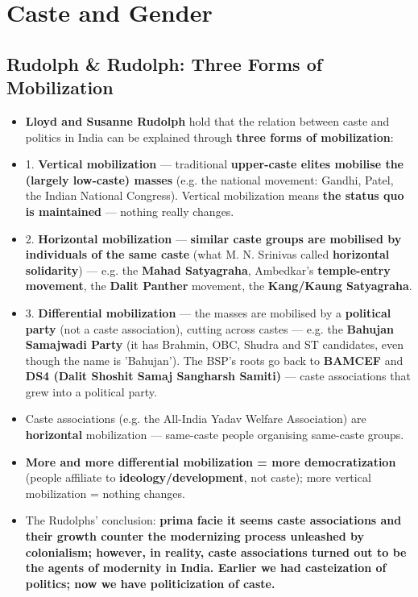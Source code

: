 \chapter{Caste and Gender}

\section{Rudolph \& Rudolph: Three Forms of Mobilization}

\begin{KeyConcept}
\begin{itemize}
\item \textbf{Lloyd and Susanne Rudolph} hold that the relation between caste and politics in India can be explained through \textbf{three forms of mobilization}:
\item 1. \textbf{Vertical mobilization} --- traditional \textbf{upper-caste elites mobilise the (largely low-caste) masses} (e.g. the national movement: Gandhi, Patel, the Indian National Congress). Vertical mobilization means \textbf{the status quo is maintained} --- nothing really changes.
\item 2. \textbf{Horizontal mobilization} --- \textbf{similar caste groups are mobilised by individuals of the same caste} (what M. N. Srinivas called \textbf{horizontal solidarity}) --- e.g. the \textbf{Mahad Satyagraha}, Ambedkar's \textbf{temple-entry movement}, the \textbf{Dalit Panther} movement, the \textbf{Kang/Kaung Satyagraha}.
\item 3. \textbf{Differential mobilization} --- the masses are mobilised by a \textbf{political party} (not a caste association), cutting across castes --- e.g. the \textbf{Bahujan Samajwadi Party} (it has Brahmin, OBC, Shudra and ST candidates, even though the name is 'Bahujan'). The BSP's roots go back to \textbf{BAMCEF} and \textbf{DS4 (Dalit Shoshit Samaj Sangharsh Samiti)} --- caste associations that grew into a political party.
\end{itemize}
\end{KeyConcept}

\begin{KeyConcept}
\begin{itemize}
\item Caste associations (e.g. the All-India Yadav Welfare Association) are \textbf{horizontal} mobilization --- same-caste people organising same-caste groups.
\item \textbf{More and more differential mobilization = more democratization} (people affiliate to \textbf{ideology/development}, not caste); more vertical mobilization = nothing changes.
\item The Rudolphs' conclusion: \textbf{prima facie it seems caste associations and their growth counter the modernizing process unleashed by colonialism; however, in reality, caste associations turned out to be the agents of modernity in India. Earlier we had casteization of politics; now we have politicization of caste.}
\end{itemize}
\end{KeyConcept}

